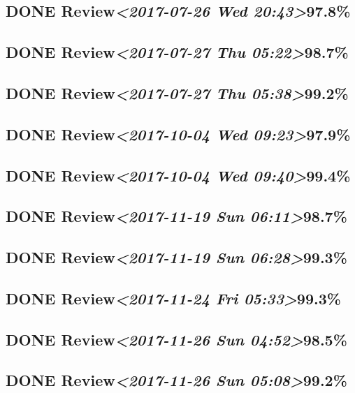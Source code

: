 \documentclass[11pt]{ctexart}
\begin{document}
\subsection{{\bfseries\sffamily DONE} Review\textit{<2017-07-26 Wed 20:43>}97.8\%}
\label{sec:orgf7f3915}
\subsection{{\bfseries\sffamily DONE} Review\textit{<2017-07-27 Thu 05:22>}98.7\%}
\label{sec:org97c726b}
\subsection{{\bfseries\sffamily DONE} Review\textit{<2017-07-27 Thu 05:38>}99.2\%}
\label{sec:org895c592}
\subsection{{\bfseries\sffamily DONE} Review\textit{<2017-10-04 Wed 09:23>}97.9\%}
\label{sec:org234f758}
\subsection{{\bfseries\sffamily DONE} Review\textit{<2017-10-04 Wed 09:40>}99.4\%}
\label{sec:org0ec087d}

\subsection{{\bfseries\sffamily DONE} Review\textit{<2017-11-19 Sun 06:11>}98.7\%}
\label{sec:org76f378f}
\subsection{{\bfseries\sffamily DONE} Review\textit{<2017-11-19 Sun 06:28>}99.3\%}
\label{sec:orgf7411c1}
\subsection{{\bfseries\sffamily DONE} Review\textit{<2017-11-24 Fri 05:33>}99.3\%}
\label{sec:orgf71e529}
\subsection{{\bfseries\sffamily DONE} Review\textit{<2017-11-26 Sun 04:52>}98.5\%}
\label{sec:orgbca5bf3}
\subsection{{\bfseries\sffamily DONE} Review\textit{<2017-11-26 Sun 05:08>}99.2\%}
\label{sec:org2b420cb}
\end{document}
